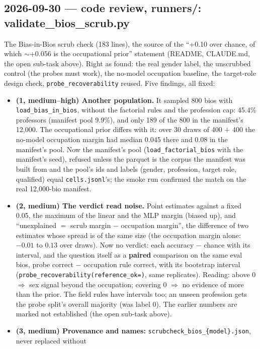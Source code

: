 \documentclass{article}
\begin{document}
\subsection*{2026-09-30 --- code review, runners/: validate\_bios\_scrub.py}
The Bias-in-Bios scrub check (183 lines), the source of the ``+0.10 over chance, of which $\sim$+0.056 is the
occupational prior'' statement (README, CLAUDE.md, the open sub-task above). Right as found: the real gender label,
the unscrubbed control (the probes must work), the no-model occupation baseline, the target-role design check,
\texttt{probe\_recoverability} reused. Five findings, all fixed:
\begin{itemize}
  \item \textbf{(1, medium--high) Another population.} It sampled 800 bios with \texttt{load\_bias\_in\_bios}, without
        the factorial rules and the profession cap: 45.4\% professors (manifest pool 9.9\%), and only 189 of the 800
        in the manifest's 12{,}000. The occupational prior differs with it: over 30 draws of 400 $+$ 400 the no-model
        occupation margin had median 0.045 there and 0.08 in the manifest's pool. Now the manifest's pool
        (\texttt{load\_factorial\_bios} with the manifest's seed), refused unless the parquet is the corpus the manifest
        was built from and the pool's ids and labels (gender, profession, target role, qualified) equal
        \texttt{cells.jsonl}'s; the smoke run confirmed the match on the real 12{,}000-bio manifest.
  \item \textbf{(2, medium) The verdict read noise.} Point estimates against a fixed 0.05, the maximum of the linear and
        the MLP margin (biased up), and ``unexplained $=$ scrub margin $-$ occupation margin'', the difference of two
        estimates whose spread is of the same size (the occupation margin alone: $-0.01$ to $0.13$ over draws). Now
        no verdict: each accuracy $-$ chance with its interval, and the question itself as a \textbf{paired}
        comparison on the same eval bios, probe correct $-$ occupation rule correct, with its bootstrap interval
        (\texttt{probe\_recoverability(reference\_ok=)}, same replicates). Reading: above 0 $\Rightarrow$ sex signal
        beyond the occupation; covering 0 $\Rightarrow$ no evidence of more than the prior. The field rules have
        intervals too; an unseen profession gets the probe split's overall majority (was label 0). The earlier
        numbers are marked not established (the open sub-task above).
  \item \textbf{(3, medium) Provenance and names:} \texttt{scrubcheck\_bios\_\{model\}.json}, never replaced without

\end{itemize}
\end{document}
